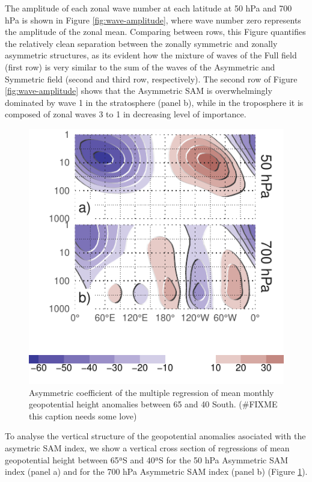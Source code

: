 \documentclass[twocol]{ametsocV5}
\begin{document}
The amplitude of each zonal wave number at each latitude at 50 hPa and
700 hPa is shown in Figure \ref{fig:wave-amplitude}, where wave number
zero represents the amplitude of the zonal mean. Comparing between rows,
this Figure quantifies the relatively clean separation between the
zonally symmetric and zonally asymmetric structures, as its evident how
the mixture of waves of the Full field (first row) is very similar to
the sum of the waves of the Asymmetric and Symmetric field (second and
third row, respectively). The second row of Figure
\ref{fig:wave-amplitude} shows that the Asymmetric SAM is overwhelmingly
dominated by wave 1 in the stratosphere (panel b), while in the
troposphere it is composed of zonal waves 3 to 1 in decreasing level of
importance.

\begin{figure}
\includegraphics{vertical-regression-1} \caption[Asymmetric coefficient of the multiple regression of mean monthly geopotential height anomalies between 65 and 40 South]{Asymmetric coefficient of the multiple regression of mean monthly geopotential height anomalies between 65 and 40 South. (\#FIXME this caption needs some love)}\label{fig:vertical-regression}
\end{figure}

To analyse the vertical structure of the geopotential anomalies
asociated with the asymetric SAM index, we show a vertical cross section
of regressions of mean geopotential height between 65ªS and 40ªS for the
50 hPa Asymmetric SAM index (panel a) and for the 700 hPa Asymmetric SAM
index (panel b) (Figure \ref{fig:vertical-regression}).
\end{document}
